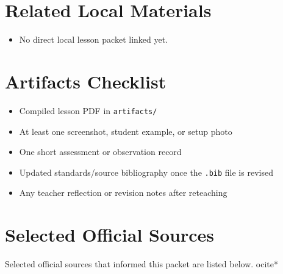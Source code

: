 \documentclass[11pt]{article}
\begin{document}
\section*{Related Local Materials}
\begin{itemize}[leftmargin=*]
\item No direct local lesson packet linked yet.
\end{itemize}

\section*{Artifacts Checklist}
\begin{itemize}[leftmargin=*]
\item Compiled lesson PDF in \texttt{artifacts/}
\item At least one screenshot, student example, or setup photo
\item One short assessment or observation record
\item Updated standards/source bibliography once the \texttt{.bib} file is revised
\item Any teacher reflection or revision notes after reteaching
\end{itemize}

\section*{Selected Official Sources}
Selected official sources that informed this packet are listed below.
ocite{*}



\end{document}
